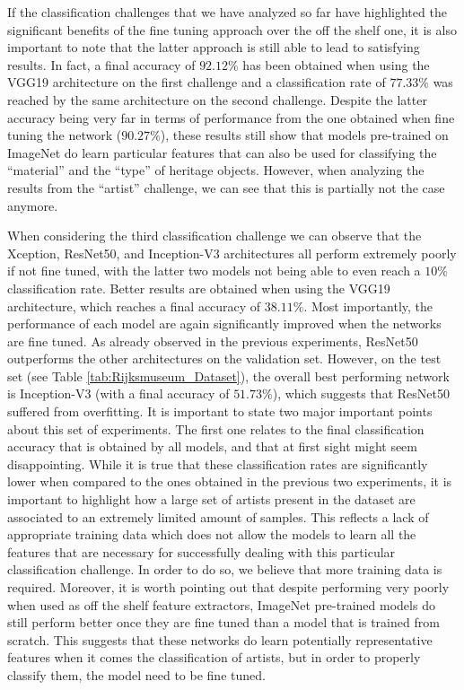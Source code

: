 If the classification challenges that we have analyzed so far have highlighted the significant benefits of the fine tuning approach over the off the shelf one, it is also important to note that the latter approach is still able to lead to satisfying results. In fact, a final accuracy of $92.12\%$ has been obtained when using the VGG19 architecture on the first challenge and a classification rate of $77.33\%$ was reached by the same architecture on the second challenge. Despite the latter accuracy being very far in terms of performance from the one obtained when fine tuning the network ($90.27\%$), these results still show that models pre-trained on ImageNet do learn particular features that can also be used for classifying the ``material'' and the ``type'' of heritage objects. However, when analyzing the results from the ``artist'' challenge, we can see that this is partially not the case anymore.




When considering the third classification challenge we can observe that the Xception, ResNet50, and Inception-V3 architectures all perform extremely poorly if not fine tuned, with the latter two models not being able to even reach a $10\%$ classification rate. Better results are obtained when using the VGG19 architecture, which reaches a final accuracy of $38.11\%$. Most importantly, the performance of each model are again significantly improved when the networks are fine tuned. As already observed in the previous experiments, ResNet50 outperforms the other architectures on the validation set. However, on the test set (see Table \ref{tab:Rijksmuseum_Dataset}), the overall best performing network is Inception-V3 (with a final accuracy of $51.73\%$), which suggests that ResNet50 suffered from overfitting. It is important to state two major important points about this set of experiments. The first one relates to the final classification accuracy that is obtained by all models, and that at first sight might seem disappointing. While it is true that these classification rates are significantly lower when compared to the ones obtained in the previous two experiments, it is important to highlight how a large set of artists present in the dataset are associated to an extremely limited amount of samples. This reflects a lack of appropriate training data which does not allow the models to learn all the features that are necessary for successfully dealing with this particular classification challenge. In order to do so, we believe that more training data is required. Moreover, it is worth pointing out that despite performing very poorly when used as off the shelf feature extractors, ImageNet pre-trained models do still perform better once they are fine tuned than a model that is trained from scratch. This suggests that these networks do learn potentially representative features when it comes the classification of artists, but in order to properly classify them, the model need to be fine tuned.

